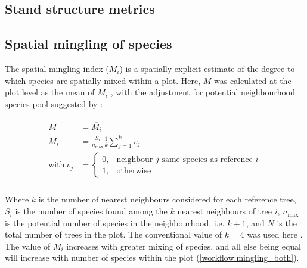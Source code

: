 \begin{refsection}
\section{Stand structure metrics}
\label{workflow:sec:struc}

\subsection{Spatial mingling of species}
\label{workflow:ssec:mingling}

The spatial mingling index ($M_{i}$) is a spatially explicit estimate of the degree to which species are spatially mixed within a plot. Here, $M$ was calculated at the plot level as the mean of $M_{i}$ \citep{Gadow2002}, with the adjustment for potential neighbourhood species pool suggested by \citet{Hui2011}: 

\begin{align}
\begin{split}
	M &= \overline{M_{i}} \\
	M_{i} &= \frac{S_{i}}{n_{\text{max}}} \frac{1}{k} \sum_{j=1}^{k} v_{j} \\
	\text{with}\ v_{j} &= \begin{cases}
		0,& \text{neighbour $j$ same species as reference $i$} \\
		1,& \text{otherwise}
	\end{cases} \\
\end{split}
\end{align}

Where $k$ is the number of nearest neighbours considered for each reference tree, $S_{i}$ is the number of species found among the $k$ nearest neighbours of tree $i$, $n_{\text{max}}$ is the potential number of species in the neighbourhood, i.e. $k + 1$, and $N$ is the total number of trees in the plot. The conventional value of $k = 4$ was used here \citep{Gadow2002, Hui2007}. The value of $M_{i}$ increases with greater mixing of species, and all else being equal will increase with number of species within the plot (\autoref{workflow:mingling_both}).


\end{refsection}
